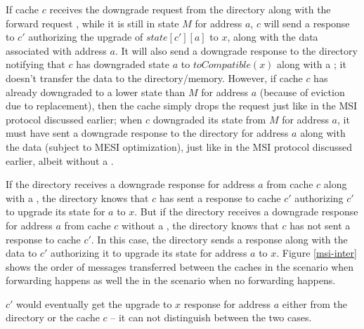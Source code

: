 If cache $c$ receives the downgrade request from the directory along with the
forward request , while it is still in state $M$ for address $a$,
$c$ will send a response to $c'$ authorizing the upgrade of $state[c'][a]$ to
$x$, along with the data associated with address $a$. It will also send a
downgrade response to the directory notifying that $c$ has downgraded state $a$
to $toCompatible(x)$ along with a \FwdAck{}; it doesn't transfer the data to the
directory/memory. However, if cache $c$ has already downgraded to a lower state
than $M$ for address $a$ (because of eviction due to replacement), then the
cache simply drops the request just like in the MSI protocol discussed earlier;
when $c$ downgraded its state from $M$ for address $a$, it must have sent a
downgrade response to the directory for address $a$ along with the data (subject
to MESI optimization), just like in the MSI protocol discussed earlier,
albeit without a \FwdAck{}.

If the directory receives a downgrade response for address $a$ from cache $c$
along with a \FwdAck{}, the directory knows that $c$ has sent a response to cache
$c'$ authorizing $c'$ to upgrade its state for $a$ to $x$. But if the directory
receives a downgrade response for address $a$ from cache $c$ without a \FwdAck{},
the directory knows that $c$ has not sent a response to cache $c'$. In this
case, the directory sends a response along with the data to $c'$ authorizing it
to upgrade its state for address $a$ to $x$. Figure \ref{msi-inter} shows the
order of messages transferred between the caches in the scenario when forwarding
happens as well the in the scenario when no forwarding happens.

$c'$ would eventually get the upgrade to $x$ response for address $a$ either
from the directory or the cache $c$ -- it can not distinguish between the two
cases.

